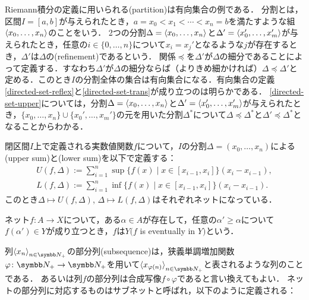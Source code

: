 \documentclass[../main.tex]{subfiles}
\begin{document}
\begin{exa}
Riemann積分の定義に用いられる(partition)は有向集合の例である．
分割とは，区間\(I = [a, b]\)が与えられたとき，\(a = x_0 < x_1 < \cdots < x_n = b\)を満たすような組\(\langle x_0, \ldots, x_n \rangle\)のことをいう．
2つの分割\(\Delta = \langle x_0, \ldots, x_n \rangle\)と\(\Delta' = \langle x_0', \ldots, x_m' \rangle\)が与えられたとき，任意の\(i \in \{0, \ldots, n\}\)について\(x_i = x_j'\)となるような\(j\)が存在するとき，\(\Delta'\)は\(\Delta\)の(refinement)であるという．
関係\(\preceq\)を\(\Delta'\)が\(\Delta\)の細分であることによって定義する．すなわち\(\Delta'\)が\(\Delta\)の細分ならば（よりきめ細かければ）\(\Delta \preceq \Delta'\)と定める．このとき\(I\)の分割全体の集合は有向集合になる．有向集合の定義\ref{directed-set-reflex}と\ref{directed-set-trans}が成り立つのは明らかである．
\ref{directed-set-upper}については，分割\(\Delta = \langle x_0, \ldots, x_n \rangle\)と\(\Delta' = \langle x_0', \ldots, x_m' \rangle\)が与えられたとき，\(\{x_0, \ldots, x_n\}\cup\{x_0', \ldots, x_m'\}\)の元を用いた分割\(\Delta^*\)について\(\Delta \preceq \Delta^*\)と\(\Delta' \preceq \Delta^*\)となることからわかる．

閉区間\(I\)上で定義される実数値関数\(f\)について，\(I\)の分割\(\Delta = (x_0, \ldots, x_n)\)による(upper sum)と(lower sum)を以下で定義する：
\begin{gather}
    U(f, \Delta) := \sum_{i = 1}^n \sup \{ f(x) \mid x \in [x_{i - 1}, x_i] \} (x_i - x_{i - 1}), \\
    L(f, \Delta) := \sum_{i = 1}^n \inf \{ f(x) \mid x \in [x_{i - 1}, x_i] \} (x_i - x_{i - 1}).
\end{gather}
このとき\(\Delta \mapsto U(f, \Delta)\), \(\Delta \mapsto L(f, \Delta)\)はそれぞれネットになっている．
\end{exa}

\begin{thmbox}
\begin{definition}
ネット\(f\colon A \to X\)について，ある\(\alpha \in A\)が存在して，任意の\(\alpha' \geq \alpha\)について
\(f(\alpha') \in Y\)が成り立つとき，\(f\)は\(Y\)\((f\) is eventually in \(Y)\)という．
\end{definition}
\end{thmbox}

列\(\Sequencen{x}\)の部分列(subsequence)は，狭義単調増加関数\(\varphi\colon\PositiveInteger\to\PositiveInteger\)を用いて\(\Subsequence{x}\)と表されるような列のことである．
あるいは列\(f\)の部分列は合成写像\(f\circ \varphi\)であると言い換えてもよい．
ネットの部分列に対応するものはサブネットと呼ばれ，以下のように定義される：
\end{document}
